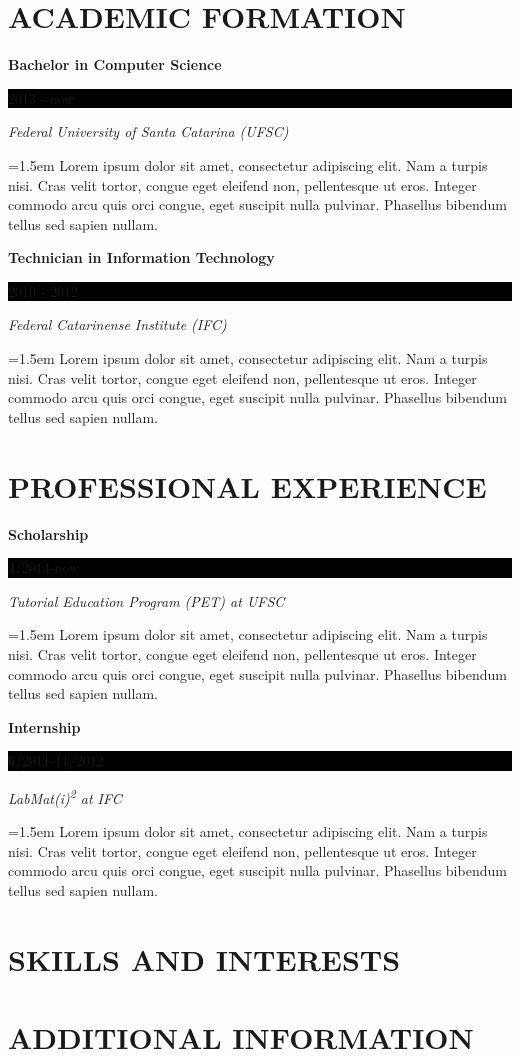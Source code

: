 \documentclass{article}
\newcommand{\sectiontitle}[1]{\section*{\uppercase{#1}}}
\newcommand{\formationentry}[4]{
	\noindent \textbf{#1} \hfill
	\colorbox{black}{
		\parbox[c][1em]{8em}{
			\hfill \color{white} #2
		}
	} \par
	\noindent \textit{#3} \par
	\noindent \hangindent=1.5em \hangafter=0 \small #4 \par
	\normalsize
	\vspace{1em}
}
\newcommand{\experienceentry}[4]{
	\noindent \textbf{#1} \hfill
	\colorbox{black}{
		\parbox[c][1em]{8em}{
			\hfill \color{white} #2
		}
	} \par
	\noindent \textit{#3} \par
	\noindent \hangindent=1.5em \hangafter=0 \small #4 \par
	\normalsize
	\vspace{1em}
}
\newenvironment{main}{
\begin{minipage}[t]{0.75\textwidth}
}{
\end{minipage}
}
\begin{document}
\hspace{1em} \vrule \hspace{1em}
\begin{main}
\sectiontitle{Academic Formation}
\formationentry{Bachelor in Computer Science}{2013 - now}{Federal University
of Santa Catarina (UFSC)}{Lorem ipsum dolor sit amet, consectetur adipiscing
elit. Nam a turpis nisi. Cras velit tortor, congue eget eleifend non,
pellentesque ut eros.  Integer commodo arcu quis orci congue, eget suscipit
nulla pulvinar. Phasellus bibendum tellus sed sapien nullam.}

\formationentry{Technician in Information Technology}{2010 - 2012}{Federal
Catarinense Institute (IFC)}{Lorem ipsum dolor sit amet, consectetur adipiscing
elit. Nam a turpis nisi. Cras velit tortor, congue eget eleifend non,
pellentesque ut eros.  Integer commodo arcu quis orci congue, eget suscipit
nulla pulvinar. Phasellus bibendum tellus sed sapien nullam.}


\sectiontitle{Professional Experience}
\experienceentry{Scholarship}{4/2014-now}{Tutorial Education Program (PET) at
UFSC}{Lorem ipsum dolor sit amet, consectetur adipiscing elit. Nam a turpis
nisi. Cras velit tortor, congue eget eleifend non, pellentesque ut eros.
Integer commodo arcu quis orci congue, eget suscipit nulla pulvinar.
Phasellus bibendum tellus sed sapien nullam.}

\experienceentry{Internship}{6/2011-11/2012}{LabMat(i)\textsuperscript{2} at
IFC}{Lorem ipsum dolor sit amet, consectetur adipiscing elit. Nam a turpis
nisi. Cras velit tortor, congue eget eleifend non, pellentesque ut eros.
Integer commodo arcu quis orci congue, eget suscipit nulla pulvinar.
Phasellus bibendum tellus sed sapien nullam.}


\sectiontitle{Skills and Interests}


\sectiontitle{Additional Information}


\end{main}
\end{document}
